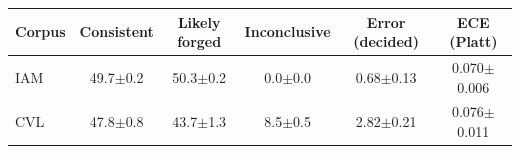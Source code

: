 \begin{tabular}{lccccc}
\toprule
Corpus & Consistent & Likely forged & Inconclusive & Error (decided) & ECE (Platt) \\
\midrule
IAM & 49.7$\pm$0.2 & 50.3$\pm$0.2 & 0.0$\pm$0.0 & 0.68$\pm$0.13 & 0.070$\pm$0.006 \\
CVL & 47.8$\pm$0.8 & 43.7$\pm$1.3 & 8.5$\pm$0.5 & 2.82$\pm$0.21 & 0.076$\pm$0.011 \\
\bottomrule
\end{tabular}
